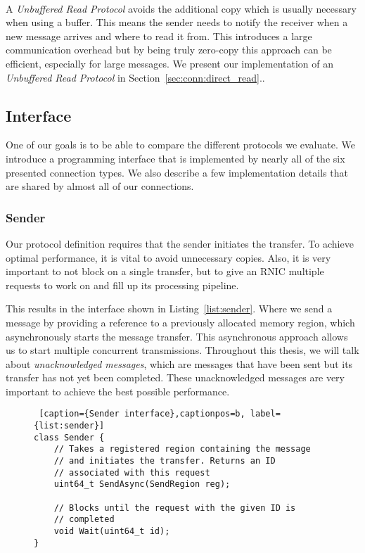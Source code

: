 \paragraph{} A \emph{Unbuffered Read Protocol} avoids the additional copy which is usually necessary when using a buffer. This means the 
sender needs to notify the receiver when a new message arrives and where to read it from.  This introduces a large
communication overhead but by being truly zero-copy this approach can be efficient, especially for large messages.
We present our implementation of an \emph{Unbuffered Read Protocol} in Section~\ref{sec:conn:direct_read}..


\pagebreak
\subsection{Interface}

One of our goals is to be able to compare the different protocols we evaluate. We introduce a programming 
interface that is implemented by nearly all of the six presented connection types. We also describe a few implementation 
details that are shared by almost all of our connections.

\subsubsection{Sender}

Our protocol definition requires that the sender initiates the transfer. To achieve optimal performance, it is
vital to avoid unnecessary copies. Also, it is very important to not block on a single transfer, but to give an RNIC multiple
requests to work on and fill up its processing pipeline. 

This results in the interface shown in Listing~\ref{list:sender}. Where we send a message by providing a reference
to a previously allocated memory region, which asynchronously starts the message transfer. This asynchronous approach allows
us to start multiple concurrent transmissions. Throughout this thesis, we will talk about \emph{unacknowledged messages}, which
are messages that have been sent but its transfer has not yet been completed. These unacknowledged messages are very 
important to achieve the best possible performance.

\begin{figure}[htp]
\begin{lstlisting} [caption={Sender interface},captionpos=b, label={list:sender}] 
class Sender {
    // Takes a registered region containing the message
    // and initiates the transfer. Returns an ID 
    // associated with this request
    uint64_t SendAsync(SendRegion reg);

    // Blocks until the request with the given ID is
    // completed
    void Wait(uint64_t id);
}
\end{lstlisting}
\end{figure}

